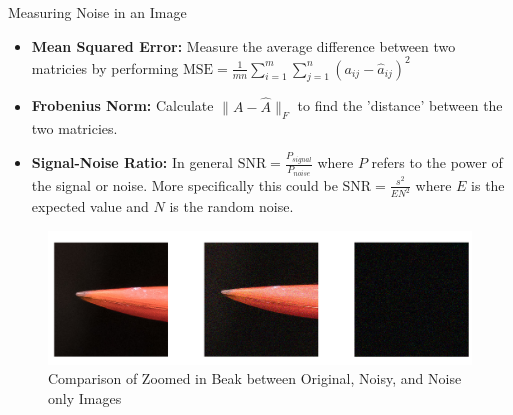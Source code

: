 \documentclass[aspectratio=169,xcolor=dvipsnames]{beamer}
\begin{document}
	
	\begin{frame}{Measuring Noise in an Image}
		\begin{itemize}
			\item \textbf{Mean Squared Error:} Measure the average difference between two matricies by performing $\text{MSE} = \frac{1}{mn}\sum_{i=1}^m\sum_{j=1}^{n}(a_{ij}-\hat{a}_{ij})^2$
			\item \textbf{Frobenius Norm:} Calculate $\|A-\hat{A}\|_F$ to find the 'distance' between the two matricies\cite{Shabalin2013}.  
			\item \textbf{Signal-Noise Ratio:} In general $\text{SNR} = \frac{P_{signal}}{P_{noise}}$ where $P$ refers to the power of the signal or noise. More specifically this could be $\text{SNR} = \frac{s^2}{EN^2}$ where $E$ is the expected value and $N$ is the random noise.
		\end{itemize}
	\begin{figure}
		\centering
		\includegraphics[scale=0.3]{BeakNoise.png}
		\caption{Comparison of Zoomed in Beak between Original, Noisy, and Noise only Images}
	\end{figure}
	\end{frame}
	
	
\end{document}
